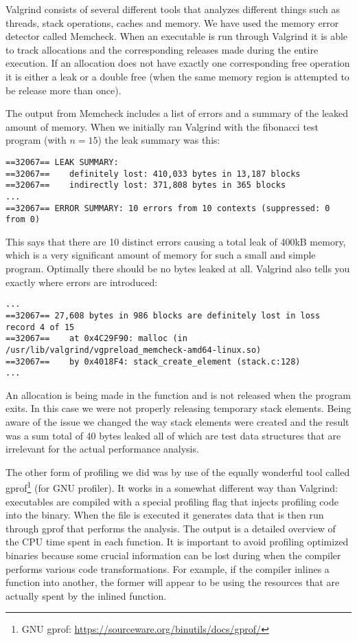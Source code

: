 Valgrind consists of several different tools that analyzes different things such
as threads, stack operations, caches and memory. We have used the memory error
detector called Memcheck. When an executable is run through Valgrind it is able
to track allocations and the corresponding releases made during the entire
execution. If an allocation does not have exactly one corresponding free
operation it is either a leak or a double free (when the same memory region is
attempted to be release more than once).

The output from Memcheck includes a list of errors and a summary of the leaked
amount of memory. When we initially ran Valgrind with the fibonacci test program
(with $n=15$) the leak summary was this:

\begin{verbatim}
==32067== LEAK SUMMARY:
==32067==    definitely lost: 410,033 bytes in 13,187 blocks
==32067==    indirectly lost: 371,808 bytes in 365 blocks
...
==32067== ERROR SUMMARY: 10 errors from 10 contexts (suppressed: 0 from 0)
\end{verbatim}

This says that there are 10 distinct errors causing a total leak of 400kB
memory, which is a very significant amount of memory for such a small and simple
program. Optimally there should be no bytes leaked at all. Valgrind also tells
you exactly where errors are introduced:

\begin{verbatim}
...
==32067== 27,608 bytes in 986 blocks are definitely lost in loss record 4 of 15
==32067==    at 0x4C29F90: malloc (in /usr/lib/valgrind/vgpreload_memcheck-amd64-linux.so)
==32067==    by 0x4018F4: stack_create_element (stack.c:128)
...
\end{verbatim}

An allocation is being made in the function  and is
not released when the program exits. In this case we were not properly releasing
temporary stack elements. Being aware of the issue we changed the way stack
elements were created and the result was a sum total of 40 bytes leaked all of
which are test data structures that are irrelevant for the actual performance
analysis.

The other form of profiling we did was by use of the equally wonderful tool
called gprof\footnote{GNU gprof:
  \url{https://sourceware.org/binutils/docs/gprof/}} (for GNU profiler). It
works in a somewhat different way than Valgrind: executables are compiled with a
special profiling flag that injects profiling code into the binary. When the
file is executed it generates data that is then run through gprof that performs
the analysis. The output is a detailed overview of the CPU time spent in each
function. It is important to avoid profiling optimized binaries because some
crucial information can be lost during when the compiler performs various code
transformations. For example, if the compiler inlines a function into another,
the former will appear to be using the resources that are actually spent by the
inlined function.

